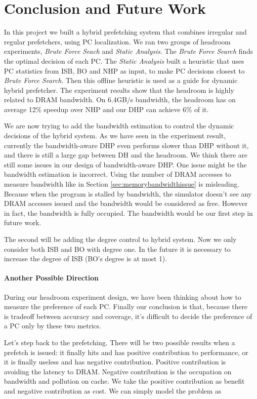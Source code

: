 \section{Conclusion and Future Work}
\label{sec:conclusion}

In this project we built a hybrid prefetching system that combines irregular and regular prefetchers, using PC localization. 
We ran two groups of headroom experiments, \emph{Brute Force Seach} and \emph{Static Analysis}. The \emph{Brute Force Search} finds the optimal decision of each PC.  
The \emph{Static Analysis} built a heuristic that uses PC statistics from ISB, BO and NHP as input, to make PC decisions closest to \emph{Brute Force Search}. 
Then this offline heuristic is used as a guide for dynamic hybrid prefetcher. 
The experiment results show that the headroom is highly related to DRAM bandwidth. On 6.4GB/s bandwidth, the headroom has on average 12\% speedup over NHP and our DHP can achieve 6\% of it. \par

We are now trying to add the bandwidth estimation to control the dynamic decisions of the hybrid system. 
As we have seen in the experiment result, currently the bandwidth-aware DHP even performs slower than DHP without it, and there is still a large gap between DH and the headroom. 
We think there are still some issues in our design of bandwidth-aware DHP. One issue might be the bandwidth estimation is incorrect. Using the number of DRAM accesses to measure bandwidth like in Section \ref{sec:memorybandwidthissue} is misleading. Because when the program is stalled by bandwidth, the simulator doesn't see any DRAM accesses issued and the bandwidth would be considered as free. However in fact, the bandwidth is fully occupied. The bandwidth would be our first step in future work. \par

The second will be adding the degree control to hybrid system. Now we only consider both ISB and BO with degree one. In the future it is necessary to increase the degree of ISB (BO's degree is at most 1).\par

\paragraph{Another Possible Direction}
During our headroom experiment design, we have been thinking about how to measure the preference of each PC. Finally our conclusion is that, because there is tradeoff between accuracy and coverage, it's difficult to decide the preference of a PC only by these two metrics. \par
Let's step back to the prefetching. There will be two possible results when a prefetch is issued: it finally hits and has positive contribution to performance, or it is finally useless and has negative contribution. Positive contribution is avoiding the latency to DRAM. Negative contribution is the occupation on bandwidth and pollution on cache. We take the positive contribution as benefit and negative contribution as cost. We can simply model the problem as\par

